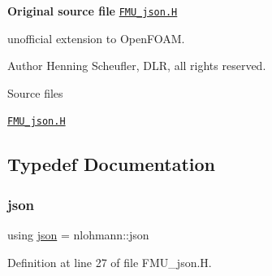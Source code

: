 {\bfseries Original source file} \href{../../../home/carlo/data/GeN-Foam/GeN-Foam_ffn/GeN-Foam/GeN-Foam/FMU4FOAM/src/OF_FMU/pyFMUSim/FMU_json.H}{\tt F\+M\+U\+\_\+json.\+H}

\begin{DoxyVerb}unofficial extension to OpenFOAM.
\end{DoxyVerb}


\label{_Description}%
 Author Henning Scheufler, D\+LR, all rights reserved.

\begin{DoxyParagraph}{Source files}

\begin{DoxyItemize}
\item \href{../../../home/carlo/data/GeN-Foam/GeN-Foam_ffn/GeN-Foam/GeN-Foam/FMU4FOAM/src/OF_FMU/pyFMUSim/FMU_json.H}{\tt F\+M\+U\+\_\+json.\+H} 
\end{DoxyItemize}
\end{DoxyParagraph}


\subsection{Typedef Documentation}
\mbox{\label{FMU__json_8H_ab701e3ac61a85b337ec5c1abaad6742d}} 
\subsubsection{\texorpdfstring{json}{json}}
{\footnotesize\ttfamily using \hyperlink{dictModifier_8C_ab701e3ac61a85b337ec5c1abaad6742d}{json} =  nlohmann\+::json}



Definition at line 27 of file F\+M\+U\+\_\+json.\+H.

